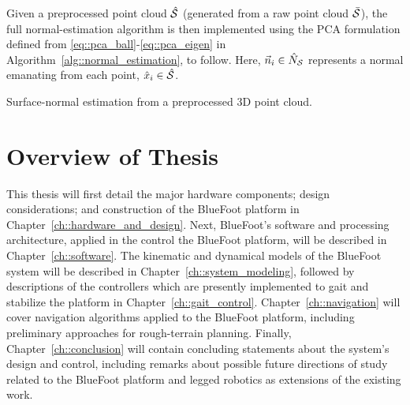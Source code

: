 		Given a preprocessed point cloud $\hat{{\cal S}}$ (generated from a raw point cloud $\bar{{\cal S}}$), the full normal-estimation algorithm is then implemented using the PCA formulation defined from \ref{eq::pca_ball}-\ref{eq::pca_eigen} in Algorithm~\ref{alg::normal_estimation}, to follow. Here, $\vec{n}_{i} \in \hat{N}_{{\cal S}}$ represents a normal emanating from each \Ith point, $\hat{x}_{i} \in \hat{{\cal S}}$.

			\begin{algorithm}[!h]
				\begin{algorithmic}
				\EndFor
				\end{algorithmic}
				\caption{Surface-normal estimation from a preprocessed 3D point cloud.}
				\label{alg::normal_estimation}
			\end{algorithm}
		

	\section{Overview of Thesis}

		This thesis will first detail the major hardware components; design considerations; and construction of the BlueFoot platform in Chapter~\ref{ch::hardware_and_design}. Next, BlueFoot's software and processing architecture, applied in the control the BlueFoot platform, will be described in Chapter~\ref{ch::software}. The kinematic and dynamical models of the BlueFoot system will be described in Chapter~\ref{ch::system_modeling}, followed by descriptions of the controllers which are presently implemented to gait and stabilize the platform in Chapter~\ref{ch::gait_control}. Chapter~\ref{ch::navigation} will cover navigation algorithms applied to the BlueFoot platform, including preliminary approaches for rough-terrain planning. Finally, Chapter~\ref{ch::conclusion} will contain concluding statements about the system's design and control, including remarks about possible future directions of study related to the BlueFoot platform and legged robotics as extensions of the existing work.
